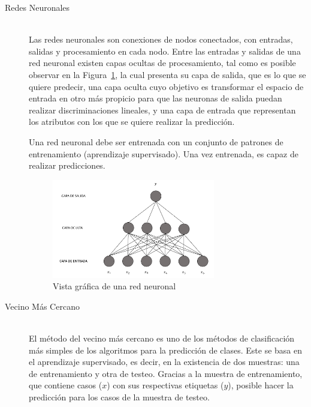\begin{enumerate}
\begin{description}
      \item[Redes Neuronales] \hfill \\
      Las redes neuronales son conexiones de nodos conectados, con entradas,  salidas y procesamiento en cada nodo. Entre las entradas y salidas de una red neuronal existen capas ocultas de procesamiento, tal como es posible observar en la Figura~\ref{fig:redneuronal}, la cual presenta su capa de salida, que es lo que se quiere predecir, una capa oculta cuyo objetivo es transformar el espacio de entrada en otro más propicio para que las neuronas de salida puedan realizar discriminaciones lineales, y una capa de entrada que representan los atributos con los que se quiere realizar la predicción. 
      
      Una red neuronal debe ser entrenada con un conjunto de patrones de entrenamiento (aprendizaje supervisado). Una vez entrenada, es capaz de realizar predicciones. 
      
       \begin{figure}[H]
        \centering
        \includegraphics[width=0.7\textwidth]{Figuras/RedNeuronal}
         \caption{Vista gráfica de una red neuronal\cite{rominalaurabot2005}}
         \label{fig:redneuronal}
      \end{figure}

      \item[Vecino Más Cercano] \hfill \\
     El método del vecino más cercano\cite{elkan2011nearest} es uno de los métodos de clasificación más simples de los algoritmos para la predicción de clases. Este se basa en el aprendizaje supervisado, es decir, en la existencia de dos muestras: una de entrenamiento y otra de testeo. Gracias a la muestra de entrenamiento, que contiene casos ($x$) con sus respectivas etiquetas ($y$), posible hacer la predicción para los casos de la muestra de testeo.
     

\end{description}
\end{enumerate}
